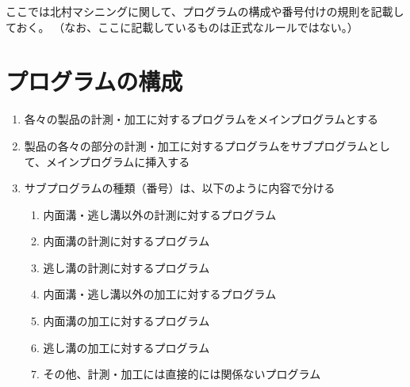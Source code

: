 
ここでは北村マシニングに関して、プログラムの構成や番号付けの規則を記載しておく。
（なお、ここに記載しているものは正式なルールではない。）


\section{プログラムの構成}
\begin{enumerate}
\item 各々の製品の計測・加工に対するプログラムをメインプログラムとする
\item 製品の各々の部分の計測・加工に対するプログラムをサブプログラムとして、メインプログラムに挿入する
\item サブプログラムの種類（番号）は、以下のように内容で分ける
  \begin{enumerate}
  \item 内面溝・逃し溝以外の計測に対するプログラム
  \item 内面溝の計測に対するプログラム
  \item 逃し溝の計測に対するプログラム
  \item 内面溝・逃し溝以外の加工に対するプログラム
  \item 内面溝の加工に対するプログラム
  \item 逃し溝の加工に対するプログラム
  \item その他、計測・加工には直接的には関係ないプログラム
  \end{enumerate}
\end{enumerate}



